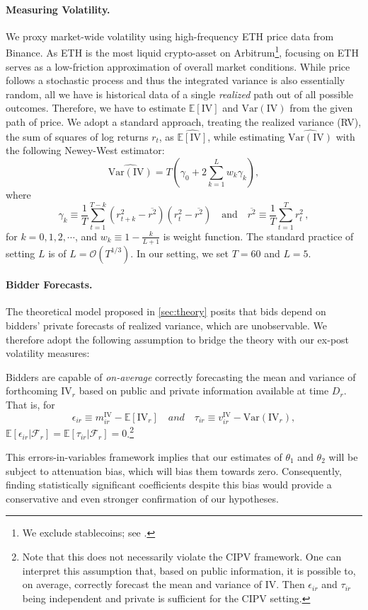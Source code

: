 \documentclass[runningheads]{llncs}
\newcommand{\E}{\mathbb{E}}
\newcommand{\Var}{\mathrm{Var}}
\newcommand{\IV}{\mathrm{IV}}
\begin{document}
\paragraph*{Measuring Volatility.} We proxy market-wide volatility using high-frequency ETH price data from Binance. As ETH is the most liquid crypto-asset on Arbitrum\footnote{We exclude stablecoins; see \cite{l2beat}.}, focusing on ETH serves as a low-friction approximation of overall market conditions. While price follows a stochastic process and thus the integrated variance is also essentially random, all we have is historical data of a single \emph{realized} path out of all possible outcomes. Therefore, we have to estimate $\E[\IV]$ and $\Var(\IV)$ from the given path of price. We adopt a standard approach, treating the realized variance (RV), the sum of squares of log returns $r_t$, as $\widehat{\E[\IV]}$, while estimating $\widehat{\Var(\IV)}$ with the following Newey-West estimator: \[
\widehat{\Var(\IV)} = T (\gamma_0 + 2\sum_{k=1}^L w_k \gamma_k),
\] where \[
\gamma_k \equiv \frac{1}{T} \sum_{t=1}^{T - k} (r^2_{t + k} - \overline{r^2})(r^2_t - \overline{r^2}) \quad \text{and} \quad \overline{r^2} \equiv \frac{1}{T} \sum_{t=1}^T r_t^2\, ,
\] for $k = 0, 1, 2, \cdots$, and $w_k \equiv 1 - \frac{k}{L + 1}$ is weight function. The standard practice of setting \(L \) is of \( L = \mathcal O(T^{1/3})\). In our setting, we set $T = 60$ and $L = 5$.

\paragraph*{Bidder Forecasts.} The theoretical model proposed in \cref{sec:theory} posits that bids depend on bidders' private forecasts of realized variance, which are unobservable. We therefore adopt the following assumption to bridge the theory with our ex-post volatility measures:

\begin{assump}
    Bidders are capable of \emph{on-average} correctly forecasting the mean and variance of forthcoming $\IV_r$ based on public and private information available at time $D_r$. That is, for \[
         \epsilon_{ir} \equiv m^{\IV}_{ir} - \E[\IV_r] \quad and \quad \tau_{ir} \equiv v^{\IV}_{ir} - \Var(\IV_r),
    \] \( \E \left[ \epsilon_{ir} | \mathcal F_r \right] = \E \left[ \tau_{ir} | \mathcal F_r\right] = 0\).\footnote{Note that this does not necessarily violate the CIPV framework. One can interpret this assumption that, based on public information, it is possible to, on average, correctly forecast the mean and variance of $\IV$. Then $\epsilon_{ir}$ and $\tau_{ir}$ being independent and private is sufficient for the CIPV setting.} %
\end{assump}
\noindent This errors-in-variables framework implies that our estimates of $\theta_1$ and $\theta_2$ will be subject to attenuation bias, which will bias them towards zero. Consequently, finding statistically significant coefficients despite this bias would provide a conservative and even stronger confirmation of our hypotheses.
\end{document}
